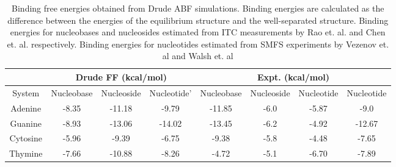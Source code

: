 \begin{landscape}
    \normalsize
    \begin{table}
        \centering
        \caption[Binding free energies obtained from Drude ABF simulations and experimental studies for nucleobases, nucleosides and nucleotides]{Binding free energies obtained from Drude ABF simulations. Binding energies are calculated as the difference between the energies of the equilibrium structure and the well-separated structure. Binding energies for nucleobases and nucleosides estimated from ITC measurements by Rao et. al.\supercite{varghese_binding_2009} and Chen et. al.\supercite{ranganathan_complex_2016} respectively. Binding energies for nucleotides estimated from SMFS experiments by Vezenov et. al\supercite{manohar_peeling_2008,iliafar_quantifying_2012} and Walsh et. al\supercite{hughes_adsorption_2017}}
        \label{tab:my-table}
        \begin{tabular}{@{}cccccccc@{}}
        \toprule
        \multicolumn{1}{c}{} & \multicolumn{3}{c}{Drude FF (kcal/mol)} & \multicolumn{4}{c}{Expt. (kcal/mol)}                   \\ \midrule
        System                 & Nucleobase\supercite{h_polarization_2021}  & Nucleoside  & Nucleotide'  & Nucleobase\supercite{varghese_binding_2009} & Nucleoside\supercite{ranganathan_complex_2016} & Nucleotide\supercite{manohar_peeling_2008,iliafar_quantifying_2012} & Nucleotide\supercite{hughes_adsorption_2017}   \\ \midrule
        Adenine                & -8.35       & -11.18      & -9.79        & -11.85     & -6.0       & -5.87      & -9.0         \\
        Guanine                & -8.93       & -13.06      & -14.02       & -13.45     & -6.2       & -4.92      & -12.67       \\
        Cytosine               & -5.96       & -9.39       & -6.75        & -9.38      & -5.8       & -4.48      & -7.65        \\
        Thymine                & -7.66       & -10.88      & -8.26        & -4.72      & -5.1       & -6.70      & -7.89                         
        \end{tabular}
    \end{table}  
\end{landscape}
